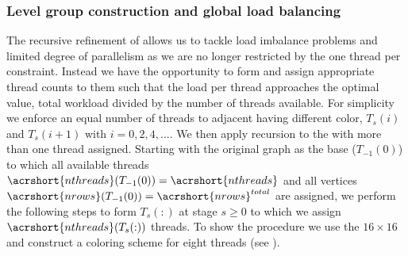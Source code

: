           
\subsubsection{Level group construction and global load balancing} \label{subsec:subgraph_selection}

The recursive refinement of \levelGroups allows us to tackle load imbalance problems and limited degree of parallelism as we are no longer restricted by the one thread per \levelGroup constraint.  Instead we have the opportunity to form \levelGroups and assign appropriate thread counts to them such that the load per thread approaches the optimal value, \ie total workload divided by the number of threads available. For simplicity we enforce an equal number of threads to adjacent \levelGroups having different color, \ie $T_s(i)$ and $T_s(i+1)$ with $i=0,2,4,...$. We then apply recursion to the \levelGroups with more than one thread assigned. Starting with the original graph as the base \levelGroup ($T_{-1}(0)$) to which all available threads $\acrshort{nthreads}(T_{-1}(0))=\acrshort{nthreads}$ and all vertices $\acrshort{nrows}(T_{-1}(0))=\acrshort{nrows}^{total}$ are assigned, we perform the following steps to form \levelGroups $T_s(:)$ at stage $s \ge 0$  to which we assign $\acrshort{nthreads}(T_{s}(:))$ threads. To show the procedure we use the $16 \times 16$ \stex and construct a coloring scheme for eight threads (see ).

